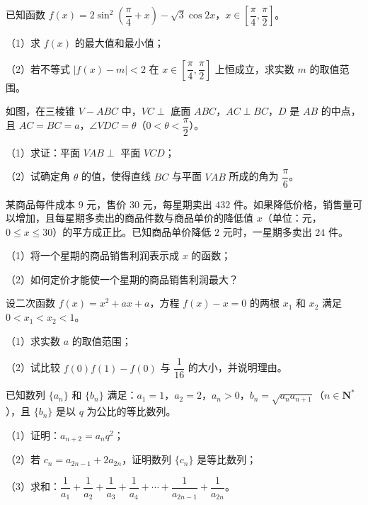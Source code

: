 \begin{question}
已知函数 $f(x)=2\sin^2\left(\dfrac{\pi}{4}+x\right)-\sqrt3\cos2x$，$x\in\left[\dfrac{\pi}{4},\dfrac{\pi}{2}\right]$。

（1）求 $f(x)$ 的最大值和最小值；

（2）若不等式 $|f(x)-m|<2$ 在 $x\in\left[\dfrac{\pi}{4},\dfrac{\pi}{2}\right]$ 上恒成立，求实数 $m$ 的取值范围。

\Needspace{0.4\textheight}
\end{question}
\begin{question}
如图，在三棱锥 $V-ABC$ 中，$VC\perp$ 底面 $ABC$，$AC\perp BC$，$D$ 是 $AB$ 的中点，且 $AC=BC=a$，$\angle VDC=\theta$（$0<\theta<\dfrac{\pi}{2}$）。

（1）求证：平面 $VAB\perp$ 平面 $VCD$；

（2）试确定角 $\theta$ 的值，使得直线 $BC$ 与平面 $VAB$ 所成的角为 $\dfrac{\pi}{6}$。
\nopagebreak[4]
\begin{center}\end{center}
\nopagebreak[4]
\end{question}
\begin{question}
某商品每件成本 $9$ 元，售价 $30$ 元，每星期卖出 $432$ 件。如果降低价格，销售量可以增加，且每星期多卖出的商品件数与商品单价的降低值 $x$（单位：元，$0\leqslant x\leqslant30$）的平方成正比。已知商品单价降低 $2$ 元时，一星期多卖出 $24$ 件。

（1）将一个星期的商品销售利润表示成 $x$ 的函数；

（2）如何定价才能使一个星期的商品销售利润最大？

\end{question}
\begin{question}
设二次函数 $f(x)=x^2+ax+a$，方程 $f(x)-x=0$ 的两根 $x_1$ 和 $x_2$ 满足 $0<x_1<x_2<1$。

（1）求实数 $a$ 的取值范围；

（2）试比较 $f(0)f(1)-f(0)$ 与 $\dfrac1{16}$ 的大小，并说明理由。

\end{question}
\begin{question}
已知数列 $\{a_n\}$ 和 $\{b_n\}$ 满足：$a_1=1$，$a_2=2$，$a_n>0$，$b_n=\sqrt{a_na_{n+1}}$（$n\in\mathbf N^*$），且 $\{b_n\}$ 是以 $q$ 为公比的等比数列。

（1）证明：$a_{n+2}=a_nq^2$；

（2）若 $c_n=a_{2n-1}+2a_{2n}$，证明数列 $\{c_n\}$ 是等比数列；

（3）求和：$\dfrac1{a_1}+\dfrac1{a_2}+\dfrac1{a_3}+\dfrac1{a_4}+\cdots+\dfrac1{a_{2n-1}}+\dfrac1{a_{2n}}$。

\Needspace{0.4\textheight}
\end{question}
